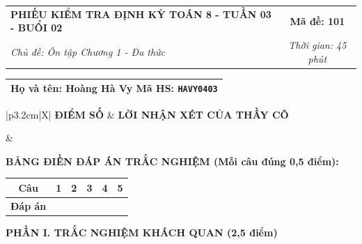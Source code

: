 \documentclass[12pt,a4paper]{article}
\begin{document}
\newpage



\noindent
\begin{tabularx}{\linewidth}{|X|c|}
\hline
\textbf{PHIẾU KIỂM TRA ĐỊNH KỲ TOÁN 8 - TUẦN 03 - BUỔI 02} & \textbf{Mã đề: 101} \\
\textit{Chủ đề: Ôn tập Chương 1 - Đa thức} & \textit{Thời gian: 45 phút} \\
\hline
\end{tabularx}

\vspace{1mm}

\noindent
\begin{tabularx}{\linewidth}{|X|}
\hline
\rule[-2mm]{0pt}{7.5mm}\textbf{Họ và tên:} \textbf{\large Hoàng Hà Vy} \hfill \textbf{Mã HS:} \texttt{HAVY0403} \quad \\
\hline
\end{tabularx}

\vspace{1mm}

\noindent
\begin{tabularx}{\linewidth}{|p{3.2cm}|X|}
\hline
\centering\textbf{ĐIỂM SỐ} & \centering\textbf{LỜI NHẬN XÉT CỦA THẦY CÔ} \tabularnewline
\hline
\rule{0pt}{1.3cm} & \tabularnewline
\hline
\end{tabularx}

\vspace{1.2mm}

\noindent\textbf{BẢNG ĐIỀN ĐÁP ÁN TRẮC NGHIỆM (Mỗi câu đúng 0,5 điểm):}
\vspace{0.8mm}

\noindent
\renewcommand{\arraystretch}{1.35}
\begin{tabularx}{\linewidth}{|c|*{5}{>{\centering\arraybackslash}X|}}
\hline
\textbf{Câu} & \textbf{1} & \textbf{2} & \textbf{3} & \textbf{4} & \textbf{5} \\
\hline
\textbf{Đáp án} & & & & & \\
\hline
\end{tabularx}
\renewcommand{\arraystretch}{1.0}

\vspace{1.5mm}

\noindent\textbf{\large PHẦN I. TRẮC NGHIỆM KHÁCH QUAN (2,5 điểm)}
\vspace{1mm}
\end{document}
